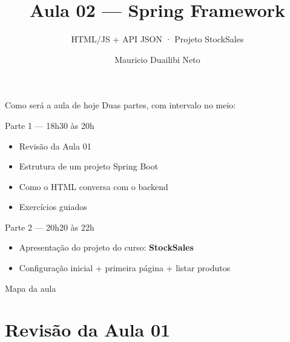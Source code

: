 \documentclass[aspectratio=169,11pt]{beamer}
\title{Aula 02 --- Spring Framework}
\subtitle{HTML/JS + API JSON · Projeto StockSales}
\author{Mauricio Duailibi Neto}
\institute{Turma Java Entra21}
\date{}
\begin{document}
\begin{frame}
  \titlepage
\end{frame}

\begin{frame}{Como será a aula de hoje}
  Duas partes, com intervalo no meio:

  \vspace{0.8em}
  \begin{block}{Parte 1 --- 18h30 às 20h}
    \begin{itemize}
      \item Revisão da Aula 01
      \item Estrutura de um projeto Spring Boot
      \item Como o HTML conversa com o backend
      \item Exercícios guiados
    \end{itemize}
  \end{block}

  \vspace{0.4em}
  \begin{block}{Parte 2 --- 20h20 às 22h}
    \begin{itemize}
      \item Apresentação do projeto do curso: \textbf{StockSales}
      \item Configuração inicial + primeira página + listar produtos
    \end{itemize}
  \end{block}
\end{frame}

\begin{frame}{Mapa da aula}
  \tableofcontents
\end{frame}

\section{Revisão da Aula 01}
\end{document}
